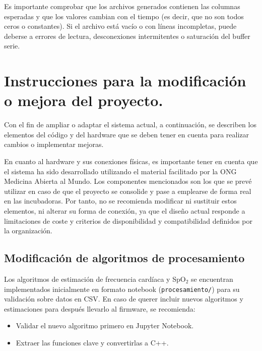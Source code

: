 Es importante comprobar que los archivos generados contienen las columnas esperadas y que los valores cambian con el tiempo (es decir, que no son todos ceros o constantes). Si el archivo está vacío o con líneas incompletas, puede deberse a errores de lectura, desconexiones intermitentes o saturación del buffer serie.

\section{Instrucciones para la modificación o mejora del proyecto.}

Con el fin de ampliar o adaptar el sistema actual, a continuación, se describen los elementos del código y del hardware que se deben tener en cuenta para realizar cambios o implementar mejoras.

En cuanto al hardware y sus conexiones físicas, es importante tener en cuenta que el sistema ha sido desarrollado utilizando el material facilitado por la ONG Medicina Abierta al Mundo. Los componentes mencionados son los que se prevé utilizar en caso de que el proyecto se consolide y pase a emplearse de forma real en las incubadoras. Por tanto, no se recomienda modificar ni sustituir estos elementos, ni alterar su forma de conexión, ya que el diseño actual responde a limitaciones de coste y criterios de disponibilidad y compatibilidad definidos por la organización. 

\subsection{Modificación de algoritmos de procesamiento}

Los algoritmos de estimación de frecuencia cardíaca y SpO$_2$ se encuentran implementados inicialmente en formato notebook (\texttt{procesamiento/}) para su validación sobre datos en CSV. En caso de querer incluir nuevos algoritmos y estimaciones para después llevarlo al firmware, se recomienda:

\begin{itemize}
    \item Validar el nuevo algoritmo primero en Jupyter Notebook.
    \item Extraer las funciones clave y convertirlas a C++.
    \item Sustituir las funciones dentro de las funciones \texttt{spo2\_algorithm.cpp} y/o \texttt{hr\_estimation.cpp} según corresponda.
\end{itemize}

